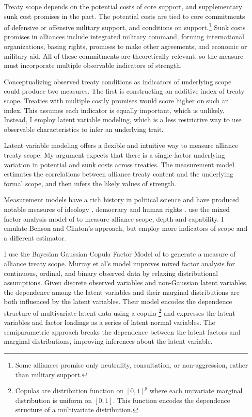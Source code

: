 \documentclass[12pt]{article}
\begin{document}
Treaty scope depends on the potential costs of core support, and supplementary sunk cost promises in the pact. 
The potential costs are tied to core commitments of defensive or offensive military support, and conditions on support.\footnote{Some alliances promise only neutrality, consultation, or non-aggression, rather than military support.}  
Sunk costs promises in alliances include integrated military command, forming international organizations, basing rights, promises to make other agreements, and economic or military aid. 
All of these commitments are theoretically relevant, so the measure must incorporate multiple observable indicators of strength. 


Conceptualizing observed treaty conditions as indicators of underlying scope could produce two measures. 
The first is constructing an additive index of treaty scope. 
Treaties with multiple costly promises would score higher on such an index. 
This assumes each indicator is equally important, which is unlikely. 
Instead, I employ latent variable modeling, which is a less restrictive way to use observable characteristics to infer an underlying trait. 


Latent variable modeling offers a flexible and intuitive way to measure alliance treaty scope. 
My argument expects that there is a single factor underlying variation in potential and sunk costs across treaties.  
The measurement model estimates the correlations between alliance treaty content and the underlying formal scope, and then infers the likely values of strength. 


Measurement models have a rich history in political science and have produced notable measures of ideology \citep{Clintonetal2004}, democracy \citep{TreierJackman2008} and human rights \citep{Fariss2014}. 
\citet{BensonClinton2016} use the mixed factor analysis model of \citet{Quinn2004} to measure alliance scope, depth and capability.
I emulate Benson and Clinton's approach, but employ more indicators of scope and a different estimator. 


I use the Bayesian Gaussian Copula Factor Model of \citet{Murrayetal2013} to generate a measure of alliance treaty scope. 
Murray et al's model improves mixed factor analysis for continuous, ordinal, and binary observed data by relaxing distributional assumptions. 
Given discrete observed variables and non-Gaussian latent variables, the dependence among the latent variables and their marginal distributions are both influenced by the latent variables.
Their model encodes the dependence structure of multivariate latent data using a copula
\footnote{Copulas are distribution function on $[0, 1]^p$ where each univariate marginal distribution is uniform on $[0,1]$. This function encodes the dependence structure of a multivariate distribution.} 
and expresses the latent variables and factor loadings as a series of latent normal variables. 
The semiparametric approach breaks the dependence between the latent factors and marginal distributions, improving inferences about the latent variable. 
\end{document}
